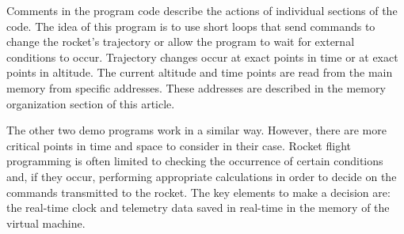 \documentclass[oneside]{book}
\begin{document}
\noindent
Comments in the program code describe the actions of individual sections of the code. The idea of this program is to use short loops that send commands to change the rocket's trajectory or allow the program to wait for external conditions to occur. Trajectory changes occur at exact points in time or at exact points in altitude. The current altitude and time points are read from the main memory from specific addresses. These addresses are described in the memory organization section of this article.

The other two demo programs work in a similar way. However, there are more critical points in time and space to consider in their case. Rocket flight programming is often limited to checking the occurrence of certain conditions and, if they occur, performing appropriate calculations in order to decide on the commands transmitted to the rocket. The key elements to make a decision are: the real-time clock and telemetry data saved in real-time in the memory of the virtual machine.
\end{document}
